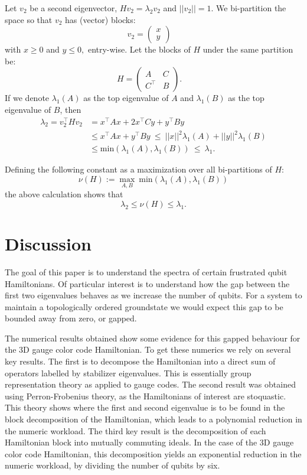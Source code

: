 \documentclass[a4paper,onecolumn,11pt,unpublished]{quantumarticle}
\def\Ham{H}
\begin{document}
Let $v_2$ be a second eigenvector, $ \Ham v_2 = \lambda_2 v_2 $ 
and $||v_2||=1$.
We bi-partition the space 
so that $v_2$ has (vector) blocks:
$$
v_2 = \left( \begin{array}{l}
x\\
y\end{array} \right)\quad
$$
with $x\ge 0$ and $y\le 0,$ entry-wise.
Let the blocks of $\Ham$ under the same partition be:
$$
\Ham = \left( \begin{array}{ll}
A&C\\
C^\top&B\end{array} \right).\quad
$$
If we denote $\lambda_1(A)$ as the top eigenvalue of $A$ and
$\lambda_1(B)$ as the top eigenvalue of $B$,
then
\begin{align*}
\lambda_2 = v_2^\top \Ham v_2 &= x^\top A x + 2 x^\top C y + y^\top B y \\
        &\le x^\top A x + y^\top B y\ \le\ ||x||^2 \lambda_1(A) + ||y||^2 \lambda_1(B) \\
        &\le \mbox{min}(\lambda_1(A), \lambda_1(B))\ \le\ \lambda_1.
\end{align*}

Defining the following constant as a maximization over
all bi-partitions of $\Ham:$
$$
    \nu(\Ham) := \max_{A, B}\ \mbox{min}(\lambda_1(A), \lambda_1(B))
$$
the above calculation shows that
$$
    \lambda_2 \le \nu(\Ham) \le \lambda_1.
$$



\section{Discussion}\label{Sec8}


The goal of this paper is to understand the spectra of
certain frustrated qubit Hamiltonians. Of particular interest is
to understand how 
the gap between the first two eigenvalues behaves as we 
increase the number of qubits.
For a system to maintain a topologically ordered groundstate
we would expect this gap to be bounded away from zero, or gapped.

The numerical results obtained show some evidence for
this gapped behaviour for the 3D gauge color code Hamiltonian.
To get these numerics we rely on several key results.
The first is to decompose the Hamiltonian into a direct sum
of operators labelled by stabilizer eigenvalues.
This is essentially group representation theory as applied to
gauge codes.
The second result was obtained using Perron-Frobenius theory, as the
Hamiltonians of interest are stoquastic.
This theory shows where the first and second eigenvalue
is to be found in the block decomposition of the Hamiltonian,
which leads to a polynomial reduction in the numeric workload.
The third key result is the decomposition of
each Hamiltonian block into mutually commuting ideals.
In the case of the 3D gauge color code Hamiltonian, this
decomposition yields an exponential reduction in 
the numeric workload, by dividing the number of qubits by six.
\end{document}
